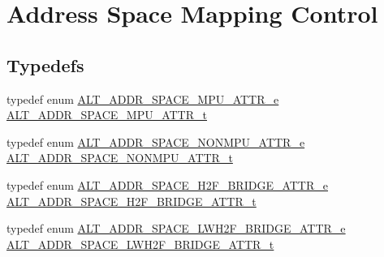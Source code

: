\hypertarget{group__ADDR__SPACE__MGR__REMAP}{}\section{Address Space Mapping Control}
\label{group__ADDR__SPACE__MGR__REMAP}
\subsection*{Typedefs}
\begin{DoxyCompactItemize}
\item 
typedef enum \mbox{\hyperlink{group__ADDR__SPACE__MGR__REMAP_gae16f0dfb718350b5140753a935059440}{A\+L\+T\+\_\+\+A\+D\+D\+R\+\_\+\+S\+P\+A\+C\+E\+\_\+\+M\+P\+U\+\_\+\+A\+T\+T\+R\+\_\+e}} \mbox{\hyperlink{group__ADDR__SPACE__MGR__REMAP_ga7b565bdc174300bbaf78d71ec496ac05}{A\+L\+T\+\_\+\+A\+D\+D\+R\+\_\+\+S\+P\+A\+C\+E\+\_\+\+M\+P\+U\+\_\+\+A\+T\+T\+R\+\_\+t}}
\item 
typedef enum \mbox{\hyperlink{group__ADDR__SPACE__MGR__REMAP_gae7413407ef45e9954d426e6e73a75463}{A\+L\+T\+\_\+\+A\+D\+D\+R\+\_\+\+S\+P\+A\+C\+E\+\_\+\+N\+O\+N\+M\+P\+U\+\_\+\+A\+T\+T\+R\+\_\+e}} \mbox{\hyperlink{group__ADDR__SPACE__MGR__REMAP_ga380facdcf5796d231a7bfaed1f444178}{A\+L\+T\+\_\+\+A\+D\+D\+R\+\_\+\+S\+P\+A\+C\+E\+\_\+\+N\+O\+N\+M\+P\+U\+\_\+\+A\+T\+T\+R\+\_\+t}}
\item 
typedef enum \mbox{\hyperlink{group__ADDR__SPACE__MGR__REMAP_ga590307e85b3ad755df3f95dbb63f5f34}{A\+L\+T\+\_\+\+A\+D\+D\+R\+\_\+\+S\+P\+A\+C\+E\+\_\+\+H2\+F\+\_\+\+B\+R\+I\+D\+G\+E\+\_\+\+A\+T\+T\+R\+\_\+e}} \mbox{\hyperlink{group__ADDR__SPACE__MGR__REMAP_gae53e07cd2bd2dec130fa387c5242b8bd}{A\+L\+T\+\_\+\+A\+D\+D\+R\+\_\+\+S\+P\+A\+C\+E\+\_\+\+H2\+F\+\_\+\+B\+R\+I\+D\+G\+E\+\_\+\+A\+T\+T\+R\+\_\+t}}
\item 
typedef enum \mbox{\hyperlink{group__ADDR__SPACE__MGR__REMAP_gada9fe5e35537a5407d3e5a5216e3f6b5}{A\+L\+T\+\_\+\+A\+D\+D\+R\+\_\+\+S\+P\+A\+C\+E\+\_\+\+L\+W\+H2\+F\+\_\+\+B\+R\+I\+D\+G\+E\+\_\+\+A\+T\+T\+R\+\_\+e}} \mbox{\hyperlink{group__ADDR__SPACE__MGR__REMAP_gac800113e41ec261e9babdebcd057d754}{A\+L\+T\+\_\+\+A\+D\+D\+R\+\_\+\+S\+P\+A\+C\+E\+\_\+\+L\+W\+H2\+F\+\_\+\+B\+R\+I\+D\+G\+E\+\_\+\+A\+T\+T\+R\+\_\+t}}
\end{DoxyCompactItemize}

